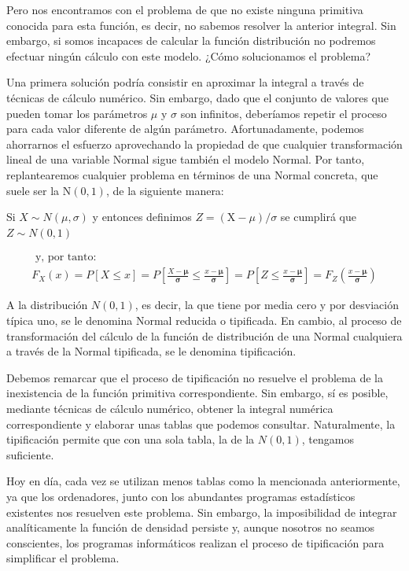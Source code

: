 \documentclass[
]{article}
\begin{document}
Pero nos encontramos con el problema de que no existe ninguna primitiva conocida para esta función, es decir, no sabemos resolver la anterior integral. Sin embargo, si somos incapaces de calcular la función distribución no podremos efectuar ningún cálculo con este modelo. ¿Cómo solucionamos el problema?

Una primera solución podría consistir en aproximar la integral a través de técnicas de cálculo numérico. Sin embargo, dado que el conjunto de valores que pueden tomar los parámetros \(\mu\) y \(\sigma\) son infinitos, deberíamos repetir el proceso para cada valor diferente de algún parámetro. Afortunadamente, podemos ahorrarnos el esfuerzo aprovechando la propiedad de que cualquier transformación lineal de una variable Normal sigue también el modelo Normal. Por tanto, replantearemos cualquier problema en términos de una Normal concreta, que suele ser la \(\mathrm{N}(0,1)\), de la siguiente manera:

Si \(X \sim N(\mu, \sigma)\) y entonces definimos \(Z=(\mathrm{X}-\mu) / \sigma\) se cumplirá que \(Z \sim N(0,1)\)

\[
\begin{gathered}
\text { y, por tanto: } \\
F_{X}(x)=P[X \leq x]=P\left[\frac{X-\boldsymbol{\mu}}{\boldsymbol{\sigma}} \leq \frac{x-\boldsymbol{\mu}}{\boldsymbol{\sigma}}\right]=P\left[Z \leq \frac{x-\boldsymbol{\mu}}{\boldsymbol{\sigma}}\right]=F_{Z}\left(\frac{x-\boldsymbol{\mu}}{\boldsymbol{\sigma}}\right)
\end{gathered}
\]

A la distribución \(N(0,1)\), es decir, la que tiene por media cero y por desviación típica uno, se le denomina Normal reducida o tipificada. En cambio, al proceso de transformación del cálculo de la función de distribución de una Normal cualquiera a través de la Normal tipificada, se le denomina tipificación.

Debemos remarcar que el proceso de tipificación no resuelve el problema de la inexistencia de la función primitiva correspondiente. Sin embargo, sí es posible, mediante técnicas de cálculo numérico, obtener la integral numérica correspondiente y elaborar unas tablas que podemos consultar. Naturalmente, la tipificación permite que con una sola tabla, la de la \(N(0,1)\), tengamos suficiente.

Hoy en día, cada vez se utilizan menos tablas como la mencionada anteriormente, ya que los ordenadores, junto con los abundantes programas estadísticos existentes nos resuelven este problema. Sin embargo, la imposibilidad de integrar analíticamente la función de densidad persiste y, aunque nosotros no seamos conscientes, los programas informáticos realizan el proceso de tipificación para simplificar el problema.
\end{document}
